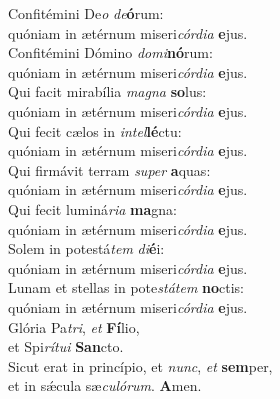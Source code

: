 \evenverse Confitémini De\textit{o} \textit{de}\textbf{ó}rum:~\*\\
\evenverse quóniam in ætérnum miseri\textit{cór}\textit{di}\textit{a} \textbf{e}jus.\\
\oddverse Confitémini Dómino \textit{do}\textit{mi}\textbf{nó}rum:~\*\\
\oddverse quóniam in ætérnum miseri\textit{cór}\textit{di}\textit{a} \textbf{e}jus.\\
\evenverse Qui facit mirabília \textit{ma}\textit{gna} \textbf{so}lus:~\*\\
\evenverse quóniam in ætérnum miseri\textit{cór}\textit{di}\textit{a} \textbf{e}jus.\\
\oddverse Qui fecit cælos in \textit{in}\textit{tel}\textbf{lé}ctu:~\*\\
\oddverse quóniam in ætérnum miseri\textit{cór}\textit{di}\textit{a} \textbf{e}jus.\\
\evenverse Qui firmávit terram \textit{su}\textit{per} \textbf{a}quas:~\*\\
\evenverse quóniam in ætérnum miseri\textit{cór}\textit{di}\textit{a} \textbf{e}jus.\\
\oddverse Qui fecit luminá\textit{ri}\textit{a} \textbf{ma}gna:~\*\\
\oddverse quóniam in ætérnum miseri\textit{cór}\textit{di}\textit{a} \textbf{e}jus.\\
\evenverse Solem in potestá\textit{tem} \textit{di}\textbf{é}i:~\*\\
\evenverse quóniam in ætérnum miseri\textit{cór}\textit{di}\textit{a} \textbf{e}jus.\\
\oddverse Lunam et stellas in pote\textit{stá}\textit{tem} \textbf{no}ctis:~\*\\
\oddverse quóniam in ætérnum miseri\textit{cór}\textit{di}\textit{a} \textbf{e}jus.\\
\evenverse Glória Pa\textit{tri}, \textit{et} \textbf{Fí}lio,~\*\\
\evenverse et Spi\textit{rí}\textit{tu}\textit{i} \textbf{San}cto.\\
\oddverse Sicut erat in princípio, et \textit{nunc}, \textit{et} \textbf{sem}per,~\*\\
\oddverse et in sǽcula sæ\textit{cu}\textit{ló}\textit{rum}. \textbf{A}men.\\
